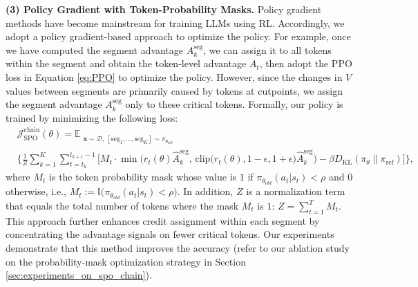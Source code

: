 \noindent\textbf{(3) Policy Gradient with Token-Probability Masks.}
\label{subsec:policy-optimization-using-ppo-loss-with-prob-mask}
Policy gradient methods have become mainstream for training LLMs using RL. Accordingly, we adopt a policy gradient-based approach to optimize the policy. For example, once we have computed the segment advantage $A_k^{\mathrm{seg}}$, we can assign it to all tokens within the segment and obtain the token-level advantage \(A_t\), then adopt the PPO loss in Equation \eqref{eq:PPO} to optimize the policy. However, since the changes in  \( V \) values between segments are primarily caused by tokens at cutpoints, we assign the segment advantage $A_k^{\mathrm{seg}}$ only to these critical tokens. Formally, our policy is trained by minimizing the following loss:
\begin{equation}
\begin{aligned}\label{eq:PPO_prob_mask}
&\mathcal{J}_{\text{SPO}}^{\text{chain}}(\theta) 
= \mathbb{E}_{\substack{\boldsymbol x \sim \mathcal D, \, [\text{seg}_1,\dots,\text{seg}_K] \sim \pi_{\theta_{old}}}} \\
&\Bigg\{
    \frac{1}{Z} \sum_{k=1}^{K} \sum_{t = t_k}^{t_{k+1}-1} \bigg[ M_t\cdot\min\Big( 
        r_t(\theta) \hat A_k^{\mathrm{seg}}, \,
        \mathrm{clip}\big(r_t(\theta), 1 - \epsilon, 1 + \epsilon\big) \hat A_k^{\mathrm{seg}} 
    \Big) - \beta D_{\mathrm{KL}}(\pi_{\theta}\|\pi_{\text{ref}})\bigg]
\Bigg\},
\end{aligned}
\end{equation}
where \(M_t\) is the token probability mask whose value is $1$ if \(\pi_{\theta_{old}}(a_t|s_t) < \rho\) and \(0\) otherwise, i.e., \( M_t:= \mathbb{I}\big(\pi_{\theta_{old}}(a_t|s_t) < \rho\big) \). In addition, \( Z \) is a normalization term that equals the total number of tokens where the mask \( M_t \) is $1$: \(Z = \sum_{t=1}^{T}M_t\). This approach further enhances credit assignment within each segment by concentrating the advantage signals on fewer critical tokens. Our experiments demonstrate that this method improves the accuracy (refer to our ablation study on the probability-mask optimization strategy in Section \ref{sec:experiments_on_spo_chain}). 


